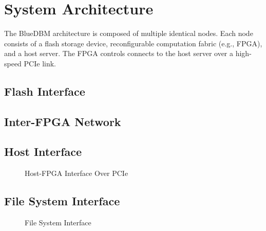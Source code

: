 \section{System Architecture}

The BlueDBM architecture is composed of multiple identical nodes. Each node
consists of a flash storage device, reconfigurable computation fabric (e.g.,
FPGA), and a host server. The FPGA controls  connects to the host server over a high-speed
PCIe link.

\subsection{Flash Interface}

\subsection{Inter-FPGA Network}

\subsection{Host Interface}

\begin{figure}[ht]
	\begin{center}
	\caption{Host-FPGA Interface Over PCIe}
	\label{fig:hostinterface}
	\end{center}
\end{figure}

\subsection{File System Interface}


\begin{figure}[ht]
	\begin{center}
	\caption{File System Interface}
	\label{fig:filesystem}
	\end{center}
\end{figure}
